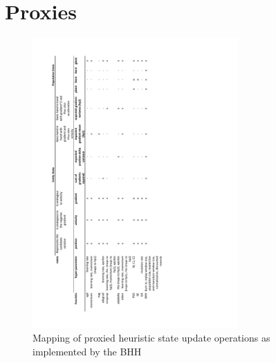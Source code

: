\section{Proxies}
\label{app:appendix_proxies}

\begin{figure}[H]
	\centering
	\includegraphics[width=0.7\textwidth]{images/bhh_heuristic_proxies.pdf}
	\caption{Mapping of proxied heuristic state update operations as implemented by the \acs{BHH}}
	\label{fig:methodology:heuristics:proxies}%
\end{figure}
